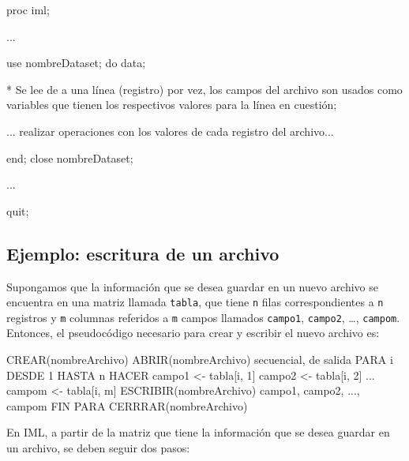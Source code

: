 \documentclass[
]{book}
\newenvironment{Shaded}{\begin{snugshade}}{\end{snugshade}}
\newcommand{\NormalTok}[1]{#1}
\begin{document}
\begin{Shaded}
\begin{Highlighting}[]
\NormalTok{proc iml;}

\NormalTok{    ...}

\NormalTok{    use nombreDataset;}
\NormalTok{    do data;}
    
\NormalTok{        * Se lee de a una línea (registro) por vez, los campos del archivo son usados como}
\NormalTok{            variables que tienen los respectivos valores para la línea en cuestión;}
        
\NormalTok{       ... realizar operaciones con los valores de cada registro del archivo...}
            
\NormalTok{    end;}
\NormalTok{    close nombreDataset;}

\NormalTok{    ...}

\NormalTok{quit;}
\end{Highlighting}
\end{Shaded}

\hypertarget{ejemplo-escritura-de-un-archivo}{%
\subsection{Ejemplo: escritura de un archivo}\label{ejemplo-escritura-de-un-archivo}}

Supongamos que la información que se desea guardar en un nuevo archivo se encuentra en una matriz llamada \texttt{tabla}, que tiene \texttt{n} filas correspondientes a \texttt{n} registros y \texttt{m} columnas referidos a \texttt{m} campos llamados \texttt{campo1}, \texttt{campo2}, \ldots, \texttt{campom}. Entonces, el pseudocódigo necesario para crear y escribir el nuevo archivo es:

\begin{Shaded}
\begin{Highlighting}[]
\NormalTok{CREAR(nombreArchivo)}
\NormalTok{ABRIR(nombreArchivo) secuencial, de salida}
\NormalTok{PARA i DESDE 1 HASTA n HACER}
\NormalTok{    campo1 \textless{}{-} tabla[i, 1]}
\NormalTok{    campo2 \textless{}{-} tabla[i, 2]}
\NormalTok{    ...}
\NormalTok{    campom \textless{}{-} tabla[i, m]}
\NormalTok{    ESCRIBIR(nombreArchivo) campo1, campo2, ..., campom}
\NormalTok{FIN PARA}
\NormalTok{CERRRAR(nombreArchivo)}
\end{Highlighting}
\end{Shaded}

En IML, a partir de la matriz que tiene la información que se desea guardar en un archivo, se deben seguir dos pasos:
\end{document}
